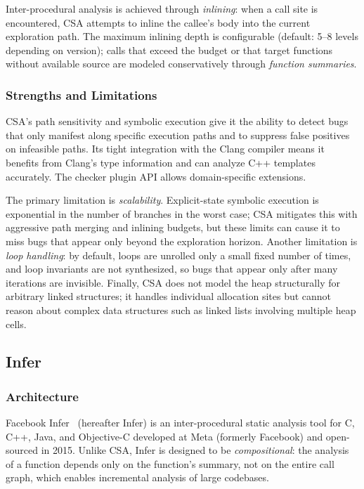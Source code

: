\documentclass[11pt,a4paper]{article}
\begin{document}
Inter-procedural analysis is achieved through \emph{inlining}: when a call site is encountered, CSA attempts to inline the callee's body into the current exploration path. The maximum inlining depth is configurable (default: 5--8 levels depending on version); calls that exceed the budget or that target functions without available source are modeled conservatively through \emph{function summaries}.

\subsubsection{Strengths and Limitations}

CSA's path sensitivity and symbolic execution give it the ability to detect bugs that only manifest along specific execution paths and to suppress false positives on infeasible paths. Its tight integration with the Clang compiler means it benefits from Clang's type information and can analyze C++ templates accurately. The checker plugin API allows domain-specific extensions.

The primary limitation is \emph{scalability}. Explicit-state symbolic execution is exponential in the number of branches in the worst case; CSA mitigates this with aggressive path merging and inlining budgets, but these limits can cause it to miss bugs that appear only beyond the exploration horizon. Another limitation is \emph{loop handling}: by default, loops are unrolled only a small fixed number of times, and loop invariants are not synthesized, so bugs that appear only after many iterations are invisible. Finally, CSA does not model the heap structurally for arbitrary linked structures; it handles individual allocation sites but cannot reason about complex data structures such as linked lists involving multiple heap cells.

\subsection{Infer} 

\subsubsection{Architecture}

Facebook Infer~\cite{calcagno2011} (hereafter Infer) is an inter-procedural static analysis tool for C, C++, Java, and Objective-C developed at Meta (formerly Facebook) and open-sourced in 2015. Unlike CSA, Infer is designed to be \emph{compositional}: the analysis of a function depends only on the function's summary, not on the entire call graph, which enables incremental analysis of large codebases.
\end{document}
